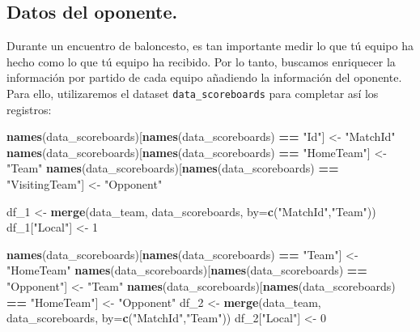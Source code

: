 \documentclass[
]{article}
\newenvironment{Shaded}{\begin{snugshade}}{\end{snugshade}}
\newcommand{\DataTypeTok}[1]{\textcolor[rgb]{0.13,0.29,0.53}{#1}}
\newcommand{\DecValTok}[1]{\textcolor[rgb]{0.00,0.00,0.81}{#1}}
\newcommand{\KeywordTok}[1]{\textcolor[rgb]{0.13,0.29,0.53}{\textbf{#1}}}
\newcommand{\NormalTok}[1]{#1}
\newcommand{\OperatorTok}[1]{\textcolor[rgb]{0.81,0.36,0.00}{\textbf{#1}}}
\newcommand{\StringTok}[1]{\textcolor[rgb]{0.31,0.60,0.02}{#1}}
\begin{document}
\hypertarget{datos-del-oponente.}{%
\subsection{Datos del oponente.}\label{datos-del-oponente.}}

Durante un encuentro de baloncesto, es tan importante medir lo que tú
equipo ha hecho como lo que tú equipo ha recibido. Por lo tanto,
buscamos enriquecer la información por partido de cada equipo añadiendo
la información del oponente. Para ello, utilizaremos el dataset
\texttt{data\_scoreboards} para completar así los registros:

\begin{Shaded}
\begin{Highlighting}[]
\KeywordTok{names}\NormalTok{(data_scoreboards)[}\KeywordTok{names}\NormalTok{(data_scoreboards) }\OperatorTok{==}\StringTok{ "Id"}\NormalTok{] <-}\StringTok{ "MatchId"}
\KeywordTok{names}\NormalTok{(data_scoreboards)[}\KeywordTok{names}\NormalTok{(data_scoreboards) }\OperatorTok{==}\StringTok{ "HomeTeam"}\NormalTok{] <-}\StringTok{ "Team"}
\KeywordTok{names}\NormalTok{(data_scoreboards)[}\KeywordTok{names}\NormalTok{(data_scoreboards) }\OperatorTok{==}\StringTok{ "VisitingTeam"}\NormalTok{] <-}\StringTok{ "Opponent"}

\NormalTok{df_}\DecValTok{1}\NormalTok{ <-}\StringTok{ }\KeywordTok{merge}\NormalTok{(data_team, data_scoreboards, }\DataTypeTok{by=}\KeywordTok{c}\NormalTok{(}\StringTok{"MatchId"}\NormalTok{,}\StringTok{"Team"}\NormalTok{))}
\NormalTok{df_}\DecValTok{1}\NormalTok{[}\StringTok{"Local"}\NormalTok{] <-}\StringTok{ }\DecValTok{1}

\KeywordTok{names}\NormalTok{(data_scoreboards)[}\KeywordTok{names}\NormalTok{(data_scoreboards) }\OperatorTok{==}\StringTok{ "Team"}\NormalTok{] <-}\StringTok{ "HomeTeam"}
\KeywordTok{names}\NormalTok{(data_scoreboards)[}\KeywordTok{names}\NormalTok{(data_scoreboards) }\OperatorTok{==}\StringTok{ "Opponent"}\NormalTok{] <-}\StringTok{ "Team"}
\KeywordTok{names}\NormalTok{(data_scoreboards)[}\KeywordTok{names}\NormalTok{(data_scoreboards) }\OperatorTok{==}\StringTok{ "HomeTeam"}\NormalTok{] <-}\StringTok{ "Opponent"}
\NormalTok{df_}\DecValTok{2}\NormalTok{ <-}\StringTok{ }\KeywordTok{merge}\NormalTok{(data_team, data_scoreboards, }\DataTypeTok{by=}\KeywordTok{c}\NormalTok{(}\StringTok{"MatchId"}\NormalTok{,}\StringTok{"Team"}\NormalTok{))}
\NormalTok{df_}\DecValTok{2}\NormalTok{[}\StringTok{"Local"}\NormalTok{] <-}\StringTok{ }\DecValTok{0}


\end{Highlighting}
\end{Shaded}
\end{document}
